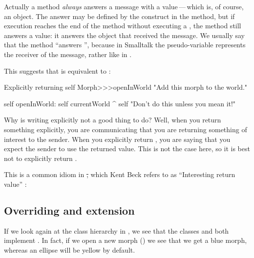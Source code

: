 \documentclass[a4paper,10pt,twoside]{book}
\begin{document}
Actually a method \emph{always} answers a message with a value\,---\,which is, of course, an object.
The answer may be defined by the \ct{^} construct in the method, but if execution reaches the end of the method without executing a \ct{^}, the method still answers a value: it answers the object that received the message.
We usually say that the method ``answers \self'', because in Smalltalk the pseudo-variable \self represents the receiver of the message, rather like  in .

This suggests that  is equivalent to :

\begin{method}[openInWorldReturnSelf]{Explicitly returning self}
Morph>>>openInWorld
	"Add this morph to the world."
	
    self openInWorld: self currentWorld
	^ self		"Don't do this unless you mean it!"
\end{method}

Why is writing  explicitly not a good thing to do?
Well, when you return something explicitly, you are communicating that you are returning something of interest to the sender.
When you explicitly return \self, you are saying that you expect the sender to use the returned value.
This is not the case here, so it is best not to explicitly return \self.

This is a common idiom in \st, which Kent Beck refers to as ``Interesting return value'' \cite{Beck97a}:


\subsection{Overriding and extension}

If we look again at the  class hierarchy in , we see that the classes  and \mbox{} both implement .
In fact, if we open a new morph () we see that we get a blue morph, whereas an ellipse will be yellow by default.
\end{document}
